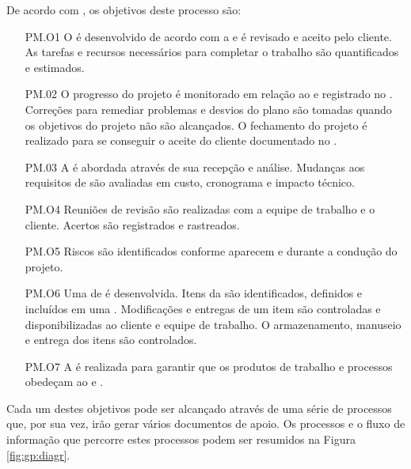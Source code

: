 De acordo com \cite{iso}, os objetivos deste processo são:

\begin{itemize}

\item[PM.O1] O \ppj é desenvolvido de acordo com a \dt e é revisado e aceito pelo cliente. As tarefas e recursos necessários para completar o trabalho são quantificados e estimados.

\item[PM.02] O progresso do projeto é monitorado em relação ao \ppj e registrado no \prog. Correções para remediar problemas e desvios do plano são tomadas quando os objetivos do projeto não são alcançados. O fechamento do projeto é realizado para se conseguir o aceite do cliente documentado no \aceite.

\item[PM.03] A \muda é abordada através de sua recepção e análise. Mudanças aos requisitos de \sw são avaliadas em custo, cronograma e impacto técnico.

\item[PM.O4] Reuniões de revisão são realizadas com a equipe de trabalho e o cliente. Acertos são registrados e rastreados.

\item[PM.O5] Riscos são identificados conforme aparecem e durante a condução do projeto.

\item[PM.O6] Uma \vcs de \sw é desenvolvida. Itens da \swcfg são identificados, definidos e incluídos em uma \bline. Modificações e entregas de um item são controladas e disponibilizadas ao cliente e equipe de trabalho. O armazenamento, manuseio e entrega dos itens são controlados.

\item[PM.O7] A \qsw é realizada para garantir que os produtos de trabalho e processos obedeçam ao \ppj e \req.

\end{itemize}

Cada um destes objetivos pode ser alcançado através de uma série de processos que, por sua vez, irão gerar vários documentos de apoio. Os processos e o fluxo de informação que percorre estes processos podem ser resumidos na Figura \ref{fig:gp:diagr}.

